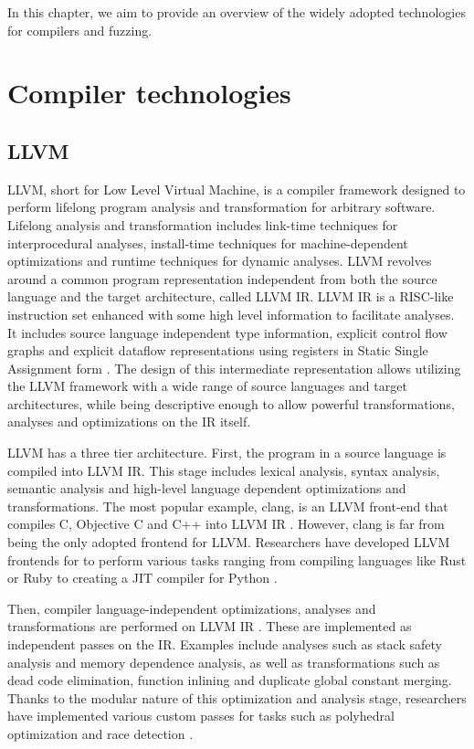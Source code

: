In this chapter, we aim to provide an overview of the widely adopted technologies for compilers and fuzzing.

\section{Compiler technologies}
\subsection{LLVM}
LLVM, short for Low Level Virtual Machine, is a compiler framework designed to perform lifelong program analysis and transformation for arbitrary software. \cite{LLVM}
Lifelong analysis and transformation includes link-time techniques for interprocedural analyses, install-time techniques for machine-dependent optimizations and runtime techniques for dynamic analyses.
LLVM revolves around a common program representation independent from both the source language and the target architecture, called LLVM IR.
LLVM IR is a RISC-like instruction set enhanced with some high level information to facilitate analyses.
It includes source language independent type information, explicit control flow graphs and explicit dataflow representations using registers in Static Single Assignment form \cite{SSA}.
The design of this intermediate representation allows utilizing the LLVM framework with a wide range of source languages and target architectures, while being descriptive enough to allow powerful transformations, analyses and optimizations on the IR itself.

LLVM has a three tier architecture. First, the program in a source language is compiled into LLVM IR.
This stage includes lexical analysis, syntax analysis, semantic analysis and high-level language dependent optimizations and transformations.
The most popular example, clang, is an LLVM front-end that compiles C, Objective C and C++ into LLVM IR \cite{clang}.
However, clang is far from being the only adopted frontend for LLVM.
Researchers have developed LLVM frontends for to perform various tasks ranging from compiling languages like Rust \cite{Rust} or Ruby \cite{RubyComp} to creating a JIT compiler for Python \cite{Numba}.

Then, compiler language-independent optimizations, analyses and transformations are performed on LLVM IR \cite{LLVMIRPasses}.
These are implemented as independent passes on the IR.
Examples include analyses such as stack safety analysis and memory dependence analysis, as well as 
transformations such as dead code elimination, function inlining and duplicate global constant merging.
Thanks to the modular nature of this optimization and analysis stage, researchers have implemented various custom passes for tasks such as polyhedral optimization \cite{Polly} and race detection \cite{DynamicRaceDetection}. 

